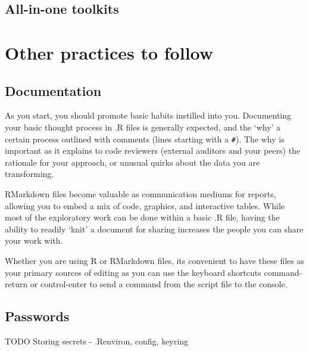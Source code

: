 \documentclass[
]{book}
\begin{document}
\hypertarget{all-in-one-toolkits}{%
\section{All-in-one toolkits}\label{all-in-one-toolkits}}

\hypertarget{other-practices-to-follow}{%
\chapter{Other practices to follow}\label{other-practices-to-follow}}

\hypertarget{documentation}{%
\section{Documentation}\label{documentation}}

As you start, you should promote basic habits instilled into you. Documenting your basic thought process in .R files is generally expected, and the `why' a certain process outlined with comments (lines starting with a \texttt{\#}). The why is important as it explains to code reviewers (external auditors and your peers) the rationale for your approach, or unusual quirks about the data you are transforming.

RMarkdown files become valuable as communication mediums for reports, allowing you to embed a mix of code, graphics, and interactive tables. While most of the exploratory work can be done within a basic .R file, having the ability to readily `knit' a document for sharing increases the people you can share your work with.

Whether you are using R or RMarkdown files, its convenient to have these files as your primary sources of editing as you can use the keyboard shortcuts command-return or control-enter to send a command from the script file to the console.

\hypertarget{passwords}{%
\section{Passwords}\label{passwords}}

TODO Storing secrets - .Renviron, config, keyring

  
\end{document}
